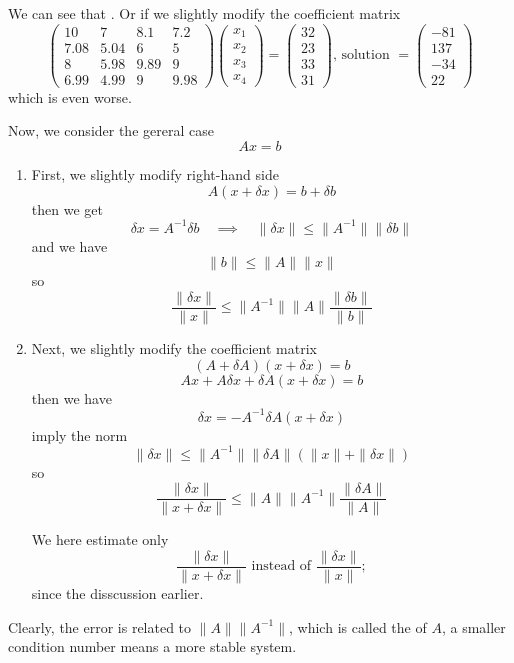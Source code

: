We can see that . Or if we slightly modify the coefficient matrix \[
    \begin{pmatrix}
        10 & 7 & 8.1 & 7.2 \\
        7.08 & 5.04 & 6 & 5 \\
        8 & 5.98 & 9.89 & 9 \\
        6.99 & 4.99 & 9 & 9.98
    \end{pmatrix}
    \begin{pmatrix}
        x_1 \\ x_2 \\ x_3 \\ x_4
    \end{pmatrix}
    =
    \begin{pmatrix}
        32 \\ 23 \\ 33\\ 31
    \end{pmatrix}
    \mbox{, solution } =
    \begin{pmatrix}
        -81 \\ 137 \\ -34 \\ 22
    \end{pmatrix}
\]
which is even worse.

Now, we consider the gereral case \[
    Ax = b
\]
\begin{enumerate}[label=$\arabic*^\circ$]
    \item First, we slightly modify right-hand side \[
        A(x + \delta x) = b + \delta b
    \]
    then we get \[
        \delta x = A^{-1} \delta b \quad \implies \quad \|\delta x\| \leq \|A^{-1}\| \|\delta b\|
    \]
    and we have \[
        \|b\| \leq \|A\| \|x\|
    \]
    so \[
        \boxed{\frac{\|\delta x\|}{\|x\|} \leq \|A^{-1}\| \|A\| \frac{\|\delta b\|}{\|b\|}}
    \]
    
    \item Next, we slightly modify the coefficient matrix \[
        (A + \delta A)(x + \delta x) = b
    \]\[
        Ax + A \delta x + \delta A (x + \delta x) = b
    \]
    then we have \[
        \delta x = -A^{-1} \delta A (x + \delta x) 
    \]
    imply the norm \[
        \|\delta x\| \leq \|A^{-1}\| \|\delta A\| (\|x\| + \|\delta x\|)
    \]
    so \[
        \boxed{\frac{\|\delta x\|}{\|x + \delta x\|} \leq \|A\|\|A^{-1}\| \frac{\|\delta A\|} {\|A\|}}
    \]
    \begin{note}
        We here estimate only \[
            \frac{\|\delta x\|}{\|x + \delta x\|}
            \text{ instead of }
            \frac{\|\delta x\|}{\|x\|};
        \]
        since the disscussion earlier.
    \end{note}
\end{enumerate}

Clearly, the error is related to $\|A\|\|A^{-1}\|$, which is called the  of $A$, a smaller condition number means a more stable system.